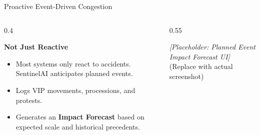 \documentclass[aspectratio=169, xcolor=table]{beamer}
\newcommand{\demoPlaceholder}[2]{
    \begin{tcolorbox}[colback=SentinelSurfaceRaised, colframe=SentinelSurfaceRaised, arc=4mm, height=#1, valign=center, halign=center]
        \textcolor{SentinelTextSec}{\Large \textit{[Placeholder: #2]}} \\
        \vspace{2mm}
        \textcolor{SentinelTextSec}{\small (Replace with actual screenshot)}
    \end{tcolorbox}
}
\begin{document}
\begin{frame}{Proactive Event-Driven Congestion}
    \begin{columns}[T]
        \begin{column}{0.4\textwidth}
            \begin{tcolorbox}[sentinelcard]
                \textbf{Not Just Reactive}
                \begin{itemize}
                    \item Most systems only react to accidents. SentinelAI anticipates planned events.
                    \item Logs VIP movements, processions, and protests.
                    \item Generates an \textbf{Impact Forecast} based on expected scale and historical precedents.
                \end{itemize}
            \end{tcolorbox}
        \end{column}
        
        \begin{column}{0.55\textwidth}
            \demoPlaceholder{6.5cm}{Planned Event Impact Forecast UI}
        \end{column}
    \end{columns}
\end{frame}
\end{document}
